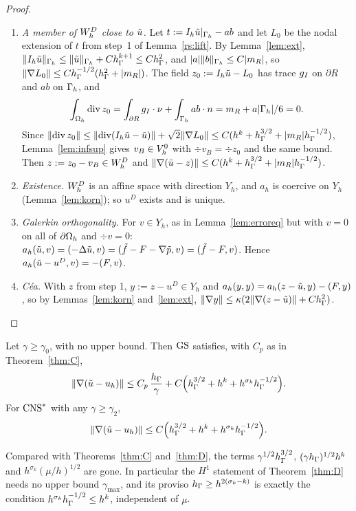 \begin{proof}
\begin{enumerate}
\item \emph{A member of $W_h^D$ close to $\tilde u$.} Let $t:=I_h\tilde u|_{\Gamma_h}-ab$ and let $L_0$ be the nodal extension of $t$ from step~1 of Lemma~\ref{rs:lift}. By Lemma~\ref{lem:ext}, $\lVert I_h\tilde u\rVert_{\Gamma_h}\le\lVert \tilde u\rVert_{\Gamma_h}+Ch_\Gamma^{k+1}\le Ch_\Gamma^2$, and $|a|\lVert b\rVert_{\Gamma_h}\le C|m_R|$, so $\lVert \nabla L_0\rVert\le Ch_\Gamma^{-1/2}(h_\Gamma^2+|m_R|)$. The field $z_0:=I_h\tilde u-L_0$ has trace $g_I$ on $\partial R$ and $ab$ on $\Gamma_h$, and
\[
\int_{\Omega_h}\operatorname{div} z_0=\int_{\partial R}g_I\cdot\nu+\int_{\Gamma_h}ab\cdot n=m_R+a|\Gamma_h|/6=0 .
\]
Since $\lVert \operatorname{div} z_0\rVert\le\lVert \operatorname{div}(I_h\tilde u-\tilde u)\rVert+\sqrt2\lVert \nabla L_0\rVert\le C(h^k+h_\Gamma^{3/2}+|m_R|h_\Gamma^{-1/2})$, Lemma~\ref{lem:infsup} gives $v_B\in V_h^0$ with $\div v_B=\div z_0$ and the same bound. Then $z:=z_0-v_B\in W_h^D$ and $\lVert \nabla(\tilde u-z)\rVert\le C(h^k+h_\Gamma^{3/2}+|m_R|h_\Gamma^{-1/2})$.
\item \emph{Existence.} $W_h^D$ is an affine space with direction $Y_h$, and $a_h$ is coercive on $Y_h$ (Lemma~\ref{lem:korn}); so $u^D$ exists and is unique.
\item \emph{Galerkin orthogonality.} For $v\in Y_h$, as in Lemma~\ref{lem:erroreq} but with $v=0$ on all of $\partial\Omega_h$ and $\div v=0$: $a_h(\tilde u,v)=(-\Delta\tilde u,v)=(\tilde f-F-\nabla\tilde p,v)=(\tilde f-F,v)$. Hence $a_h(\tilde u-u^D,v)=-(F,v)$.
\item \emph{C\'ea.} With $z$ from step 1, $y:=z-u^D\in Y_h$ and $a_h(y,y)=a_h(z-\tilde u,y)-(F,y)$, so by Lemmas~\ref{lem:korn} and~\ref{lem:ext}, $\lVert \nabla y\rVert\le\kappa(2\lVert \nabla(z-\tilde u)\rVert+Ch_\Gamma^2)$.\qedhere
\end{enumerate}
\end{proof}

\begin{theorem}\label{rs:unif}
Let $\gamma\ge\gamma_0$, with no upper bound. Then $\mathrm{GS}$ satisfies, with $C_p$ as in Theorem~\ref{thm:C},
\[
\lVert \nabla(\tilde u-u_h)\rVert\le C_p\,\frac{h_\Gamma}{\gamma}+C\Bigl(h_\Gamma^{3/2}+h^k+h^{\sigma_k}h_\Gamma^{-1/2}\Bigr).
\]
For $\mathrm{CNS}^\ast$ with any $\gamma\ge\gamma_2$,
\[
\lVert \nabla(\tilde u-u_h)\rVert\le C\Bigl(h_\Gamma^{3/2}+h^k+h^{\sigma_k}h_\Gamma^{-1/2}\Bigr).
\]
\end{theorem}

Compared with Theorems~\ref{thm:C} and~\ref{thm:D}, the terms $\gamma^{1/2}h_\Gamma^{3/2}$, $(\gamma h_\Gamma)^{1/2}h^k$ and $h^{\sigma_k}(\mu/h)^{1/2}$ are gone. In particular the $H^1$ statement of Theorem~\ref{thm:D} needs no upper bound $\gamma_{\max}$, and its proviso $h_\Gamma\ge h^{2(\sigma_k-k)}$ is exactly the condition $h^{\sigma_k}h_\Gamma^{-1/2}\le h^k$, independent of $\mu$.

